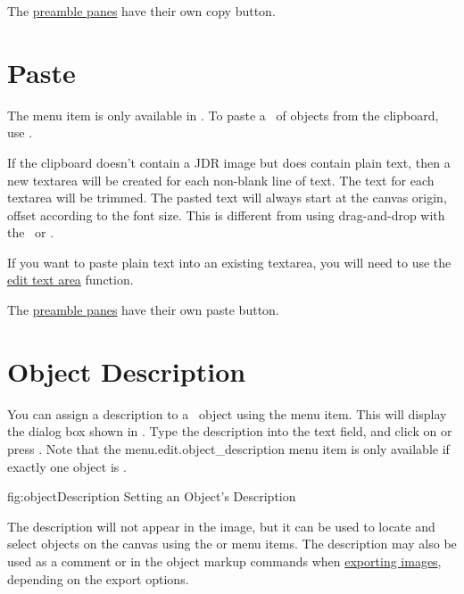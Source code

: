 \begin{information}
The \hyperref[sec:preamblepanels]{preamble panes} have
their own copy button.
\end{information}

\section{Paste}\label{sec:pasteobjects}


The  menu item is only available in \selectmode.
To paste a \selection\ of \glspl{object} from the clipboard, use
.

If the clipboard doesn't contain a \gls{JDR} image but does contain
plain text, then a new \gls{textarea} will be created for each
non-blank line of text. The text for each \gls{textarea} will be
trimmed. The pasted text will always start at the \gls{canvas}
origin, offset according to the font size. This is different from
using \gls{drag-and-drop} with the \texttool\ or \mathstool.

If you want to paste plain text into an existing
\gls*{textarea}, you will need to use the
\hyperref[sec:edittext]{edit text area} function.  

\begin{information}
The \hyperref[sec:preamblepanels]{preamble panes} have their own paste button.
\end{information}

\section{Object Description}\label{sec:objectdescription}


You can assign a description to a \selected\ \gls*{object} using the
 menu item. This will display the
dialog box shown in . Type the
description into the text field, and click on  or press
.  Note that the \gls{menu.edit.object_description}
menu item is only available if exactly one object is \selected.

\FloatFig
  {fig:objectDescription}
  {}
  {Setting an Object's Description}

The description will not appear in the image, but it can be used to
locate and select \glspl*{object} on the canvas using the
 or
 menu items. The description
may also be used as a comment or in the object markup commands when
\hyperref[sec:exportimage]{exporting images}, depending on the
export options.

